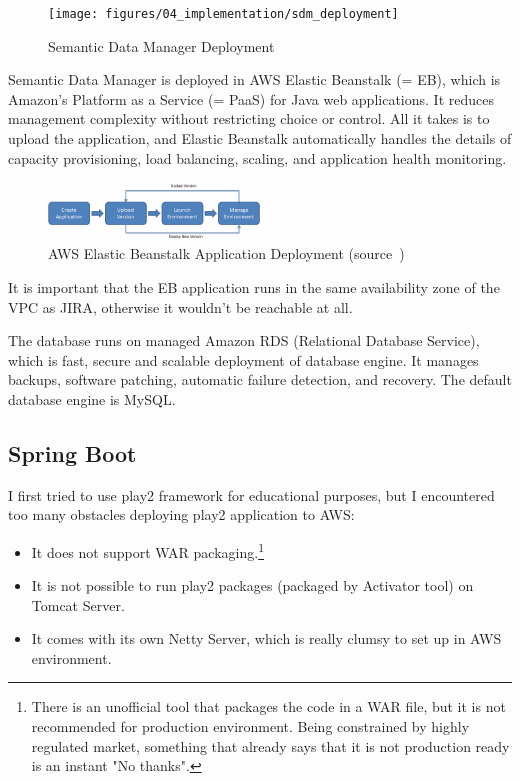 \begin{figure}[!ht]
	\centering
	\texttt{[image: figures/04\_implementation/sdm\_deployment]}
    \caption{Semantic Data Manager Deployment}
\end{figure}

Semantic Data Manager is deployed in AWS Elastic Beanstalk (= EB), which is Amazon's Platform as a Service (= PaaS) for Java web applications. It reduces management complexity without restricting choice or control. All it takes is to upload the application, and Elastic Beanstalk automatically handles the details of capacity provisioning, load balancing, scaling, and application health monitoring.

\newpage

\begin{figure}[!ht]
	\centering
	\includegraphics[width=0.5\textwidth]{figures/04_implementation/eb_flowchart}
    \caption[AWS Elastic Beanstalk Application Deployment]{AWS Elastic Beanstalk Application Deployment (source~\protect\cite{elasticbeanstalk})}
\end{figure}

It is important that the EB application runs in the same availability zone of the VPC as JIRA, otherwise it wouldn't be reachable at all.

The database runs on managed Amazon RDS (Relational Database Service), which is fast, secure and scalable deployment of database engine. It manages backups, software patching, automatic failure detection, and recovery. The default database engine is MySQL.

\subsection{Spring Boot}

I first tried to use play2 framework for educational purposes, but I encountered too many obstacles deploying play2 application to AWS: 

\begin{itemize}
	\item It does not support WAR packaging.\footnote{There is an unofficial tool that packages the code in a WAR file, but it is not recommended for production environment. Being constrained by highly regulated market, something that already says that it is not production ready is an instant "No thanks".}
	\item It is not possible to run play2 packages (packaged by Activator tool) on Tomcat Server.
	\item It comes with its own Netty Server, which is really clumsy to set up in AWS environment.
\end{itemize}

